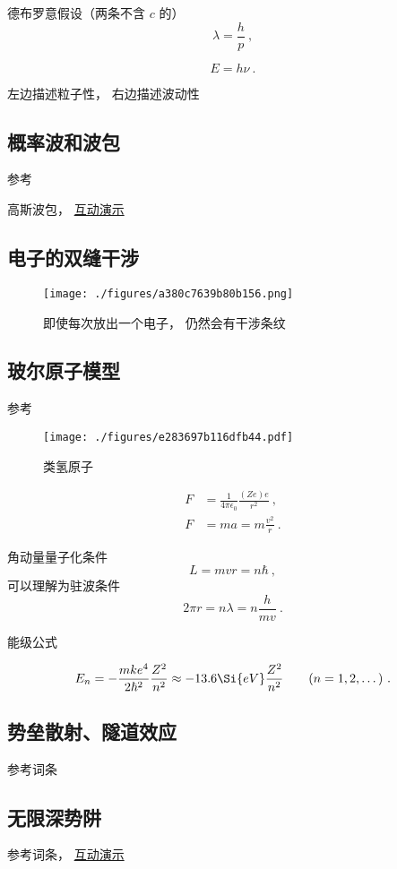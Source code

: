 德布罗意假设（两条不含 $c$ 的）
\begin{equation}
\lambda = \frac{h}{p}~,
\end{equation}

\begin{equation}
E = h\nu~.
\end{equation}

左边描述粒子性， 右边描述波动性

\subsection{概率波和波包}
参考

高斯波包， \href{https://wuli.wiki/apps/gausWP.html}{互动演示}

\subsection{电子的双缝干涉}

\begin{figure}[ht]
\centering
\texttt{[image: ./figures/a380c7639b80b156.png]}
\caption{即使每次放出一个电子， 仍然会有干涉条纹} \label{fig_QMIntr_3}
\end{figure}

\subsection{玻尔原子模型}

参考

\begin{figure}[ht]
\centering
\texttt{[image: ./figures/e283697b116dfb44.pdf]}
\caption{类氢原子} \label{fig_QMIntr_1}
\end{figure}

\begin{equation}
\begin{aligned}
F &= \frac{1}{4\pi \epsilon_0} \frac{(Ze)e}{r^2}~,
\\
F &= ma = m\frac{v^2}{r}~.
\end{aligned}
\end{equation}

角动量量子化条件
\begin{equation}
L = mvr = n\hbar~,
\end{equation}
可以理解为驻波条件
\begin{equation}
2\pi r = n \lambda = n \frac{h}{mv}~.
\end{equation}

能级公式

\begin{equation}
E_n =  - \frac{m k e^4}{2 \hbar ^2} \frac{Z^2}{n^2} \approx - 13.6\Si{eV} \frac{Z^2}{n^2}
\qquad (n = 1, 2, \dots)~.
\end{equation}

\subsection{势垒散射、隧道效应}
参考词条

\subsection{无限深势阱}
参考词条， \href{https://wuli.wiki/apps/QMISW.html}{互动演示}

